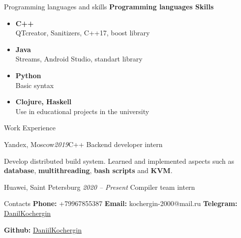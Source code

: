 \documentclass{resume} %
\begin{document}
\begin{rSection}{Programming languages and skills}
{\bf {\large Programming languages} \hspace{138pt} {\large Skills}}
\begin{itemize}
    \item {{\bf C++}  \hspace{240pt}   \\
    QTcreator, Sanitizers, C++17, boost library} 
    \item { {\bf Java } \hspace{240pt}  \\
    Streams, Android Studio, standart library}
    \item {{\bf Python }} \hspace{224pt}  
    \\ Basic syntax
    \item {{\bf Clojure, Haskell }} \hspace{175pt} 
    \\ Use in educational projects in the university
\end{itemize}


\end{rSection}


\begin{rSection}{Work Experience}

\begin{rSubsection}{Yandex, Moscow}{ {\em 2019}}{C++ Backend developer intern}{}
\item Develop distributed build system. Learned and implemented aspects such as  {\bf database}, {\bf multithreading}, {\bf bash scripts} and {\bf KVM}.
\end{rSubsection}

\begin{rSubsection}
{Huawei, Saint Petersburg} {\em 2020 -- Present} {Compiler team intern} {}
\end{rSubsection}

\end{rSection}


\begin{rSection} {Contacts}
 \textbf{Phone:} +79967855387 \hspace{0.8cm} \textbf{Email:} kochergin-2000@mail.ru \hspace{0.8cm} \textbf{Telegram:} \href{http://t.me/DanilKochergin}{DanilKochergin} 
 \item \textbf{Github:} \href{http://github.com/DaniilKochergin}{DaniilKochergin}
\end{rSection}
\end{document}
